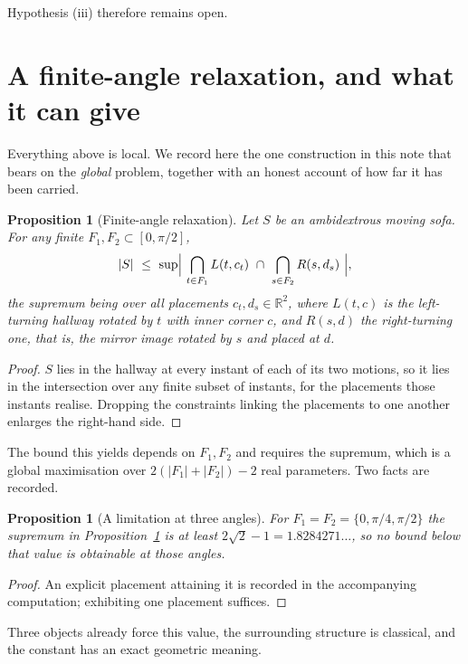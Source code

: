 \documentclass[11pt]{article}
\newtheorem{proposition}[theorem]{Proposition}
\theoremstyle{definition}
\newcommand{\R}{\mathbb{R}}
\begin{document}
Hypothesis (iii) therefore remains open.

\section{A finite-angle relaxation, and what it can give}\label{sec:upper}

Everything above is local. We record here the one construction in this note that bears on
the \emph{global} problem, together with an honest account of how far it has been carried.

\begin{proposition}[Finite-angle relaxation]\label{prop:relax}
Let $S$ be an ambidextrous moving sofa. For any finite $F_1,F_2\subset[0,\pi/2]$,
\[
  |S|\ \le\ \sup\Bigl|\ \bigcap_{t\in F_1}L(t,c_t)\ \cap\ \bigcap_{s\in F_2}R(s,d_s)\ \Bigr| ,
\]
the supremum being over all placements $c_t,d_s\in\R^2$, where $L(t,c)$ is the
left-turning hallway rotated by $t$ with inner corner $c$, and $R(s,d)$ the right-turning
one, that is, the mirror image rotated by $s$ and placed at $d$.
\end{proposition}

\begin{proof}
$S$ lies in the hallway at every instant of each of its two motions, so it lies in the
intersection over any finite subset of instants, for the placements those instants
realise. Dropping the constraints linking the placements to one another enlarges the
right-hand side.
\end{proof}

The bound this yields depends on $F_1,F_2$ and requires the supremum, which is a global
maximisation over $2(|F_1|+|F_2|)-2$ real parameters. Two facts are recorded.

\begin{proposition}[A limitation at three angles]\label{prop:relax3}
For $F_1=F_2=\{0,\pi/4,\pi/2\}$ the supremum in Proposition~\ref{prop:relax} is at least
$2\sqrt2-1=1.8284271\ldots$, so no bound below that value is obtainable at those angles.
\end{proposition}

\begin{proof}
An explicit placement attaining it is recorded in the accompanying computation; exhibiting
one placement suffices.
\end{proof}

Three objects already force this value, the surrounding structure is classical, and the
constant has an exact geometric meaning.
\end{document}
